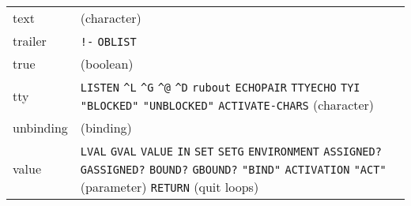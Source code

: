 \documentclass[a4paper,]{article}
\begin{document}
\begin{longtable}[]{@{}ll@{}}
\begin{minipage}[t]{0.11\columnwidth}
text\strut
\end{minipage} & \begin{minipage}[t]{0.83\columnwidth}\raggedright\strut
(character)\strut
\end{minipage}\tabularnewline
\begin{minipage}[t]{0.11\columnwidth}\raggedright\strut
trailer\strut
\end{minipage} & \begin{minipage}[t]{0.83\columnwidth}\raggedright\strut
\texttt{!-} \texttt{OBLIST}\strut
\end{minipage}\tabularnewline
\begin{minipage}[t]{0.11\columnwidth}\raggedright\strut
true\strut
\end{minipage} & \begin{minipage}[t]{0.83\columnwidth}\raggedright\strut
(boolean)\strut
\end{minipage}\tabularnewline
\begin{minipage}[t]{0.11\columnwidth}\raggedright\strut
tty\strut
\end{minipage} & \begin{minipage}[t]{0.83\columnwidth}\raggedright\strut
\texttt{LISTEN} \texttt{\^{}L} \texttt{\^{}G} \texttt{\^{}@} \texttt{\^{}D} \texttt{rubout} \texttt{ECHOPAIR}
\texttt{TTYECHO} \texttt{TYI} \texttt{"BLOCKED"} \texttt{"UNBLOCKED"} \texttt{ACTIVATE-CHARS} (character)\strut
\end{minipage}\tabularnewline
\begin{minipage}[t]{0.11\columnwidth}\raggedright\strut
unbinding\strut
\end{minipage} & \begin{minipage}[t]{0.83\columnwidth}\raggedright\strut
(binding)\strut
\end{minipage}\tabularnewline
\begin{minipage}[t]{0.11\columnwidth}\raggedright\strut
value\strut
\end{minipage} & \begin{minipage}[t]{0.83\columnwidth}\raggedright\strut
\texttt{LVAL} \texttt{GVAL} \texttt{VALUE} \texttt{IN} \texttt{SET} \texttt{SETG} \texttt{ENVIRONMENT} \texttt{ASSIGNED?}
\texttt{GASSIGNED?} \texttt{BOUND?} \texttt{GBOUND?} \texttt{"BIND"} \texttt{ACTIVATION} \texttt{"ACT"} (parameter)
\texttt{RETURN} (quit loops)\strut
\end{minipage}\tabularnewline
\bottomrule
\end{longtable}

\end{document}
